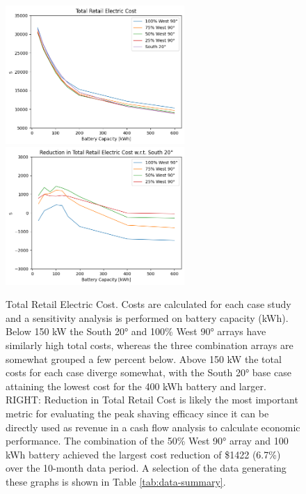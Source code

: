 \documentclass[journal,article,submit,pdftex,moreauthors]{Definitions/mdpi}
\begin{document}
\begin{figure}[!h]
  \centering
  \includegraphics[width=6.8cm]{./images/total cost.png}
  \includegraphics[width=6.8cm]{./images/total cost reduction.png}
  \caption{Total Retail Electric Cost. Costs are calculated for each case study and a sensitivity analysis is performed on battery capacity (kWh). Below 150 kW the South 20° and 100\% West 90° arrays have similarly high total costs, whereas the three combination arrays are somewhat grouped a few percent below. Above 150 kW the total costs for each case diverge somewhat, with the South 20° base case attaining the lowest cost for the 400 kWh battery and larger. RIGHT: Reduction in Total Retail Cost is likely the most important metric for evaluating the peak shaving efficacy since it can be directly used as revenue in a cash flow analysis to calculate economic performance. The combination of the 50\% West 90° array and 100 kWh battery achieved the largest cost reduction of \$1422 (6.7\%) over the 10-month data period. A selection of the data generating these graphs is shown in Table \ref{tab:data-summary}.}
  \label{fig:total-cost}
\end{figure}
\end{document}
